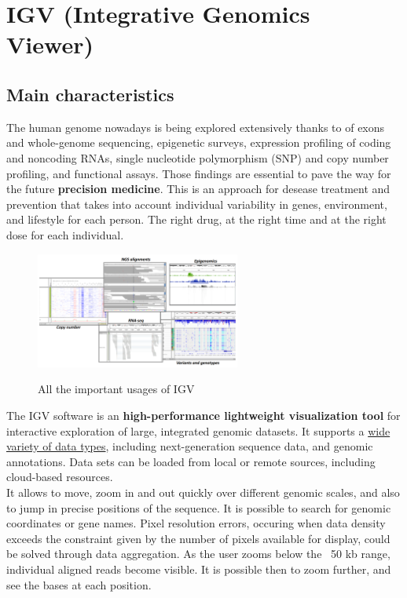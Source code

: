 \graphicspath{{chapters/IGVimages/}}

\chapter*{IGV (Integrative Genomics Viewer)}

\section*{Main characteristics}
The human genome nowadays is being explored extensively thanks to of exons and
whole-genome sequencing, epigenetic surveys, expression profiling of coding and
noncoding RNAs, single nucleotide polymorphism (SNP) and copy number profiling,
and functional assays. Those findings are essential to pave the way for the
future \textbf{precision medicine}. This is an approach for desease treatment and
prevention that takes into account individual variability in genes, environment,
and lifestyle for each person. The right drug, at the right time and at the
right dose for each individual. 

\begin{figure}[H]
    \caption{All the important usages of IGV}
    \centering
    \includegraphics[width=0.6\textwidth]{usagesIGV.PNG}
    \label{IGVusages}
\end{figure}

The IGV software is an \textbf{high-performance lightweight visualization tool}
for interactive exploration of large, integrated genomic datasets. It supports a
\underline{wide variety of data types}, including next-generation sequence data,
and genomic annotations. Data sets can be loaded from local or remote sources,
including cloud-based resources. \\
It allows to move, zoom in and out quickly over different genomic scales, and also to
jump in precise positions of the sequence. It is possible to search for genomic coordinates or gene names. Pixel
resolution errors, occuring when data density exceeds the constraint given by
the number of pixels available for display, could be solved through data
aggregation. As the user zooms below the ~50 kb range, individual aligned reads
become visible. It is possible then to zoom further, and see the bases at each
position.
 
